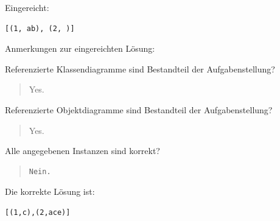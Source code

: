 Eingereicht:


\begin{verbatim}
[(1, ab), (2, )]
\end{verbatim}


Anmerkungen zur eingereichten Lösung:

Referenzierte Klassendiagramme sind Bestandteil der Aufgabenstellung?\begin{quote}Yes.\end{quote}Referenzierte Objektdiagramme sind Bestandteil der Aufgabenstellung?\begin{quote}Yes.\end{quote}Alle angegebenen Instanzen sind korrekt?

\begin{quote}
\begin{verbatim}
Nein.
\end{verbatim}
\end{quote}

Die korrekte Lösung ist:
\begin{verbatim}
[(1,c),(2,ace)]
\end{verbatim}


